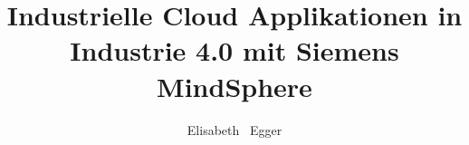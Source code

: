 \documentclass[bachelor,german]{hgbthesis}
\title{Industrielle Cloud Applikationen in Industrie 4.0 mit Siemens MindSphere}
\author{Elisabeth \ Egger}
\begin{document}

\frontmatter                    %

\maketitle
\tableofcontents

		
			

\mainmatter          %











\appendix                                            %


\MakeBibliography                        %

%

\end{document}
